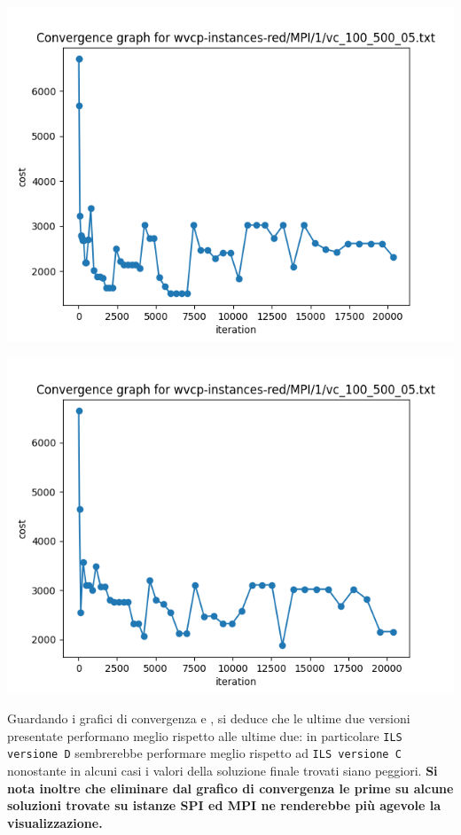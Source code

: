 \documentclass[11pt]{article}
\begin{document}
\begin{center}
\begin{minipage}{0.49\linewidth}
\includegraphics[width=\linewidth]{conv_graph_vc_100_500_05_rand_C.png}
\end{minipage}
\begin{minipage}{0.49\linewidth}
\includegraphics[width=\linewidth]{conv_graph_vc_100_500_05_rand_D.png}
\end{minipage}
\end{center}

\pagebreak

Guardando i grafici di convergenza e , si deduce che le ultime due versioni presentate performano meglio rispetto alle ultime due: in particolare \verb|ILS versione D| sembrerebbe performare meglio rispetto ad \verb|ILS versione C| nonostante in alcuni casi i valori della soluzione finale trovati siano peggiori.
\textbf{Si nota inoltre che eliminare dal grafico di convergenza le prime su alcune soluzioni trovate su istanze SPI ed MPI ne renderebbe più agevole la visualizzazione.}
\end{document}
